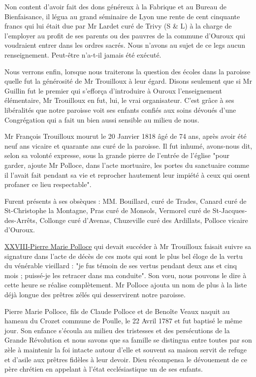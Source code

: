 Non content d'avoir fait des dons généreux à la Fabrique et au Bureau de Bienfaisance, il légua au grand séminaire de Lyon une rente de cent cinquante francs qui lui était due par Mr Lardet curé de Trivy (S \& L) à la charge de l'employer au profit de ses parents ou des pauvres de la commune d'Ouroux qui voudraient entrer dans les ordres sacrés. Nous n'avons au sujet de ce legs aucun renseignement. Peut-être n'a-t-il jamais été exécuté.

Nous verrons enfin, lorsque nous traiterons la question des écoles dans la paroisse quelle fut la générosité de Mr Trouilloux à leur égard. Disons seulement que si Mr Guillin fut le premier qui s'efforça d'introduire à Ouroux l'enseignement élémentaire, Mr Trouilloux en fut, lui, le vrai organisateur. C'est grâce à ses libéralités que notre paroisse voit ses enfants confiés aux soins dévoués d'une Congrégation qui a fait un bien aussi sensible au milieu de nous.

Mr François Trouilloux mourut le 20 Janvier 1818 âgé de 74 ans, après avoir été neuf ans vicaire et quarante ans curé de la paroisse. Il fut inhumé, avons-nous dit, selon sa volonté expresse, sous la grande pierre de l'entrée de l'église "pour garder, ajoute Mr Polloce, dans l'acte mortuaire, les portes du sanctuaire comme il l'avait fait pendant sa vie et reprocher hautement leur impiété à ceux qui osent profaner ce lieu respectable".

Furent présents à ses obsèques : MM. Bouillard, curé de Trades, Canard
curé de St-Christophe la Montagne, Pras curé de Monsols, Vermorel curé de St-Jacques-des-Arrêts, Collonge curé d'Avenas, Chuzeville curé des Ardillats, Polloce vicaire d'Ouroux.

\underline{XXVIII-Pierre Marie Polloce} qui devait succéder à Mr Trouilloux faisait suivre sa signature dans l'acte de décès de ces mots qui sont le plus bel éloge de la vertu du vénérable vieillard : "je fus témoin de ses vertus pendant deux ans et cinq mois ; puissé-je les retracer dans ma conduite". Son vœu, nous pouvons le dire à cette heure se réalise complètement. Mr Polloce ajouta un nom de plus à la liste déjà longue des prêtres zélés qui desservirent notre paroisse.

Pierre Marie Polloce, fils de Claude Polloce et de Benoîte Veaux naquit au hameau du Crozet commune de Poulle, le 22 Avril 1787 et fut baptisé le même jour. Son enfance s'écoula au milieu des tristesses et des persécutions de la Grande Révolution et nous savons que sa famille se distingua entre toutes par son zèle à maintenir la foi intacte autour d'elle et souvent sa maison servit de refuge et d'asile aux prêtres fidèles à leur devoir. Dieu récompensa le dévouement de ce père chrétien en appelant à l'état ecclésiastique un de ses enfants.

